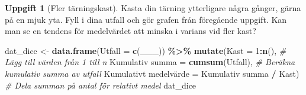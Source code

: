 \documentclass[
]{book}
\newenvironment{Shaded}{\begin{snugshade}}{\end{snugshade}}
\newcommand{\AttributeTok}[1]{\textcolor[rgb]{0.13,0.29,0.53}{#1}}
\newcommand{\CommentTok}[1]{\textcolor[rgb]{0.56,0.35,0.01}{\textit{#1}}}
\newcommand{\DecValTok}[1]{\textcolor[rgb]{0.00,0.00,0.81}{#1}}
\newcommand{\FunctionTok}[1]{\textcolor[rgb]{0.13,0.29,0.53}{\textbf{#1}}}
\newcommand{\NormalTok}[1]{#1}
\newcommand{\OtherTok}[1]{\textcolor[rgb]{0.56,0.35,0.01}{#1}}
\newcommand{\SpecialCharTok}[1]{\textcolor[rgb]{0.81,0.36,0.00}{\textbf{#1}}}
\newcommand{\StringTok}[1]{\textcolor[rgb]{0.31,0.60,0.02}{#1}}
\theoremstyle{definition}
\theoremstyle{definition}
\theoremstyle{definition}
\newtheorem{exercise}{Uppgift}[chapter]
\theoremstyle{definition}
\theoremstyle{remark}
\begin{document}
\begin{exercise}[Fler tärningskast]

Kasta din tärning ytterligare några gånger, gärna på en mjuk yta. Fyll i dina utfall och gör grafen från föregående uppgift. Kan man se en tendens för medelvärdet att minska i varians vid fler kast?

\begin{Shaded}
\begin{Highlighting}[]
\NormalTok{dat\_dice }\OtherTok{\textless{}{-}} \FunctionTok{data.frame}\NormalTok{(}\AttributeTok{Utfall =} \FunctionTok{c}\NormalTok{(\_\_\_)) }\SpecialCharTok{\%\textgreater{}\%} 
  \FunctionTok{mutate}\NormalTok{(}\AttributeTok{Kast =} \DecValTok{1}\SpecialCharTok{:}\FunctionTok{n}\NormalTok{(),                                          }\CommentTok{\# Lägg till värden från 1 till n}
         \StringTok{\textasciigrave{}}\AttributeTok{Kumulativ summa}\StringTok{\textasciigrave{}} \OtherTok{=} \FunctionTok{cumsum}\NormalTok{(Utfall),                    }\CommentTok{\# Beräkna kumulativ summa av utfall}
         \StringTok{\textasciigrave{}}\AttributeTok{Kumulativt medelvärde}\StringTok{\textasciigrave{}} \OtherTok{=} \StringTok{\textasciigrave{}}\AttributeTok{Kumulativ summa}\StringTok{\textasciigrave{}} \SpecialCharTok{/}\NormalTok{ Kast)    }\CommentTok{\# Dela summan på antal för relativt medel}
\NormalTok{dat\_dice}
\end{Highlighting}
\end{Shaded}

\end{exercise}
\end{document}
